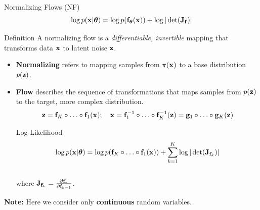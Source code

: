 \documentclass{beamer}
\begin{document}
\begin{frame}{Normalizing Flows (NF)}
	\vspace{-0.3cm}
	\[
		\log p(\mathbf{x}|\boldsymbol{\theta}) = \log p(\mathbf{f}_{\boldsymbol{\theta}}(\mathbf{x})) + \log |\det (\mathbf{J}_{\mathbf{f}})|
	\]
	\vspace{-0.4cm}
	\begin{block}{Definition}
		A normalizing flow is a \textit{differentiable, invertible} mapping that transforms data $\mathbf{x}$ to latent noise $\mathbf{z}$.
	\end{block}
    \eqpause
	\begin{itemize}
		\item \textbf{Normalizing} refers to mapping samples from $\pi(\mathbf{x})$ to a base distribution $p(\mathbf{z})$.
		\item \textbf{Flow} describes the sequence of transformations that maps samples from $p(\mathbf{z})$ to the target, more complex distribution.
		\[
			\mathbf{z} = \mathbf{f}_K \circ \ldots \circ \mathbf{f}_1(\mathbf{x}); \quad \mathbf{x} = \mathbf{f}_1^{-1} \circ \ldots \circ \mathbf{f}_K^{-1} (\mathbf{z}) = \mathbf{g}_1 \circ \ldots \circ \mathbf{g}_K(\mathbf{z})
		\] 
		\vspace{-0.4cm}
		\eqpause
		\begin{block}{Log-Likelihood}
			\vspace{-0.5cm}
			\[
				\log p(\mathbf{x}|\boldsymbol{\theta}) = \log p(\mathbf{f}_K \circ \ldots \circ \mathbf{f}_1(\mathbf{x})) + \sum_{k=1}^K \log |\det (\mathbf{J}_{\mathbf{f}_k})|
			\]
			\vspace{-0.4cm} \\
			where $\mathbf{J}_{\mathbf{f}_k} = \frac{\partial \mathbf{f}_k}{\partial \mathbf{f}_{k-1}}$.
		\end{block}
	\end{itemize}
	\eqpause
	\textbf{Note:} Here we consider only \textbf{continuous} random variables.
\end{frame}
\end{document}

